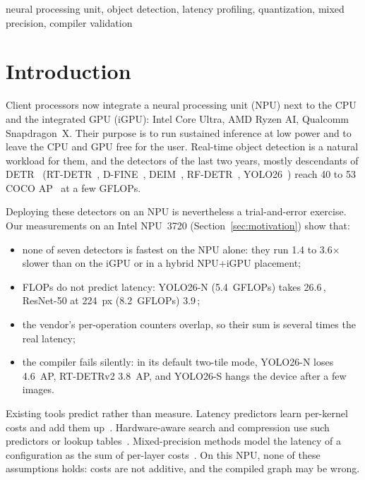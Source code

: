 \documentclass[conference]{IEEEtran}
\newcommand{\ms}{\,\text{ms}}
\begin{document}
\begin{IEEEkeywords}
neural processing unit, object detection, latency profiling, quantization, mixed precision, compiler validation
\end{IEEEkeywords}

\section{Introduction}

Client processors now integrate a neural processing unit (NPU) next to the CPU and the integrated GPU (iGPU): Intel Core Ultra, AMD Ryzen AI, Qualcomm Snapdragon~X. Their purpose is to run sustained inference at low power and to leave the CPU and GPU free for the user. Real-time object detection is a natural workload for them, and the detectors of the last two years, mostly descendants of DETR~\cite{carion2020detr} (RT-DETR~\cite{zhao2024rtdetr,lv2024rtdetrv2}, D-FINE~\cite{peng2025dfine}, DEIM~\cite{huang2025deim,huang2025deimv2}, RF-DETR~\cite{robinson2026rfdetr}, YOLO26~\cite{jocher2026yolo26}) reach 40 to 53 COCO AP~\cite{lin2014coco} at a few GFLOPs.

Deploying these detectors on an NPU is nevertheless a trial-and-error exercise. Our measurements on an Intel NPU~3720 (Section~\ref{sec:motivation}) show that:
\begin{itemize}
\item none of seven detectors is fastest on the NPU alone: they run 1.4 to 3.6$\times$ slower than on the iGPU or in a hybrid NPU+iGPU placement;
\item FLOPs do not predict latency: YOLO26-N (5.4~GFLOPs) takes 26.6\ms{}, ResNet-50 at 224~px (8.2~GFLOPs) 3.9\ms{};
\item the vendor's per-operation counters overlap, so their sum is several times the real latency;
\item the compiler fails silently: in its default two-tile mode, YOLO26-N loses 4.6~AP, RT-DETRv2 3.8~AP, and YOLO26-S hangs the device after a few images.
\end{itemize}

Existing tools predict rather than measure. Latency predictors learn per-kernel costs and add them up~\cite{zhang2021nnmeter,li2021hwnasbench,dudziak2020brpnas}. Hardware-aware search and compression use such predictors or lookup tables~\cite{yang2018netadapt,cai2019proxylessnas,tan2019mnasnet,he2018amc}. Mixed-precision methods model the latency of a configuration as the sum of per-layer costs~\cite{yao2021hawqv3}. On this NPU, none of these assumptions holds: costs are not additive, and the compiled graph may be wrong.
\end{document}
